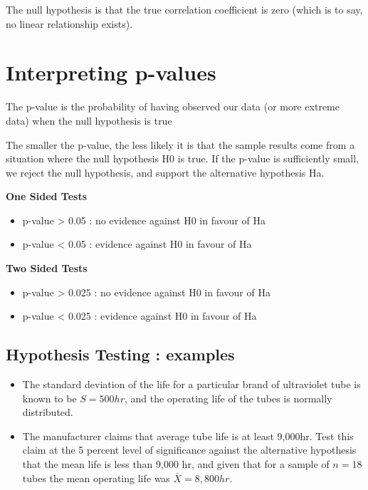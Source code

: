 The null hypothesis is that the true correlation coefficient is zero (which is to say, no linear relationship exists). 




\section{Interpreting p-values}

The p-value is the probability of having observed our data (or more extreme data) when the null hypothesis is true 

The smaller the p-value, the less likely it is that the sample results come from a situation where the null hypothesis H0 is true. If the p-value is sufficiently small, we reject the null hypothesis, and support the alternative hypothesis Ha.

\begin{framed}	
	\textbf{One Sided Tests}
	\begin{itemize}
		\item 		p-value  >  0.05   :   no evidence against H0 in favour of Ha
		
		\item 	p-value    <  0.05   :   evidence against H0 in favour of Ha
	\end{itemize}	
	\textbf{Two Sided Tests}
	\begin{itemize}
		\item 	p-value    >  0.025   :   no evidence against H0 in favour of Ha
		
		\item 	p-value    <  0.025   :   evidence against H0 in favour of Ha
	\end{itemize}		
\end{framed}





\subsection{Hypothesis Testing : examples}

\begin{itemize}
	\item The standard deviation of the life for a particular brand of
	ultraviolet tube is known to be $S = 500 hr$, and the operating
	life of the tubes is normally distributed. 
	\item The manufacturer claims
	that average tube life is at least 9,000hr. Test this claim at the
	5 percent level of significance against the alternative hypothesis
	that the mean life is less than 9,000 hr, and given that for a
	sample of $n = 18$ tubes the mean operating life was $\bar{X}=
	8,800 hr.$
	
\end{itemize}

